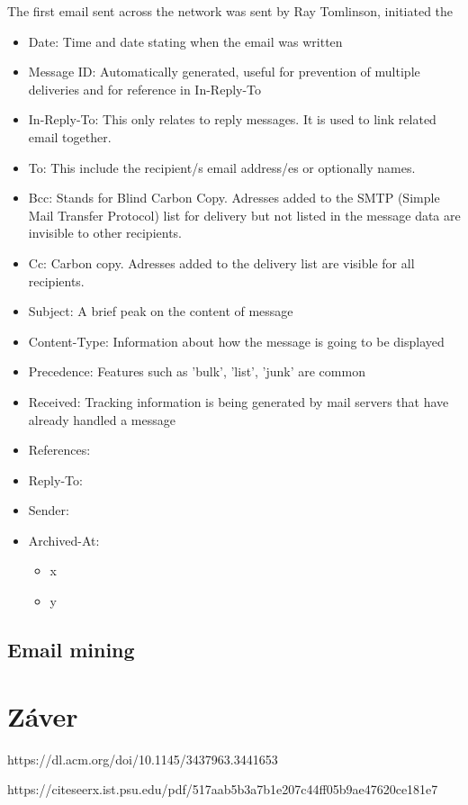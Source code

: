 \documentclass[10pt,twoside,slovak,a4paper]{article}
\begin{document}
The first email sent across the network was sent by Ray Tomlinson, initiated the 
\begin{itemize}
\item Date: Time and date stating when the email was written
\item Message ID: Automatically generated, useful for prevention of multiple deliveries and for reference in In-Reply-To
\item In-Reply-To: This only relates to reply messages. It is used to link related email together. 
\item To: This include the recipient/s email address/es or optionally names. 
\item Bcc: Stands for Blind Carbon Copy. Adresses added to the SMTP (Simple Mail Transfer Protocol) list for delivery but not listed in the message data are invisible to other recipients. 
\item Cc: Carbon copy. Adresses added to the delivery list are visible for all recipients. 
\item Subject: A brief peak on the content of message
\item Content-Type: Information about how the message is going to be displayed
\item Precedence: Features such as 'bulk', 'list', 'junk' are common
\item Received: Tracking information is being generated by mail servers that have already handled a message 
\item References: 
\item Reply-To:
\item Sender:
\item Archived-At:
	\begin{itemize}
	\item x
	\item y
	\end{itemize}
\end{itemize}





\subsection{Email mining} \label{email mining}




\section{Záver} \label{zaver} %






https://dl.acm.org/doi/10.1145/3437963.3441653

https://citeseerx.ist.psu.edu/pdf/517aab5b3a7b1e207c44ff05b9ae47620ce181e7
\end{document}
